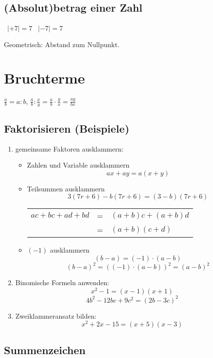 \begin{multicols}{2}
\subsection*{(Absolut)betrag einer Zahl}%
\hfill\, $|+7| = 7$ \hfill\, $|-7| = 7$ \hfill\, %

Geometrisch: Abstand zum Nullpunkt.


\section*{Bruchterme}
    $\frac{a}b = a : b$,\phantom{ and }  $\frac{a}b : \frac{x}y = \frac{a}b\cdot{}\frac{y}x = \frac{ay}{bx}$
    
\subsection*{Faktorisieren (Beispiele)}

\begin{enumerate}
\item gemeinsame Faktoren ausklammern:
\begin{itemize}
\item Zahlen und Variable ausklammern
$$ax + ay = a(x+y)$$
\item
Teilsummen ausklammern
$$3(7r+6) - b(7r+6) = (3-b)(7r+6)$$
\begin{tabular}{rcl}
$ac+bc+ad+bd$ &=& $(a+b)c+(a+b)d$ \\
              &=& $(a+b)(c+d)$
\end{tabular}              

\item $(-1)$ ausklammern
  $$(b-a)=(-1)\cdot{}(a-b)$$
  $$(b-a)^2 = \left((-1)\cdot{}(a-b)\right)^2 = (a-b)^2$$
\end{itemize}

\item Binomische Formeln anwenden:
$$x^2-1 = (x-1)(x+1)$$
$$4b^2 -12bc + 9c^2=(2b-3c)^2$$
\item Zweiklammeransatz bilden:
$$x^2+2x-15 = (x+5)(x-3)$$

\end{enumerate}
\forceCB{}%
\headerUndFooterDieseSeite{}

\subsection*{Summenzeichen}


\end{multicols}
